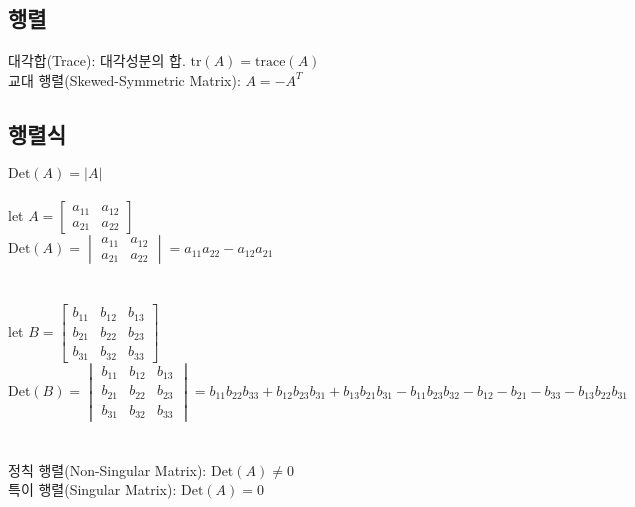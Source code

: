 \subsection{행렬}
대각합(Trace): 대각성분의 합. $\mathrm{tr}(A) = \mathrm{trace}(A)$\\
교대 행렬(Skewed-Symmetric Matrix): $A=-A^T$

\subsection{행렬식}
$\mathrm{Det}(A) = |A|$\\\\
let $A = \begin{bmatrix}
    a_{11} & a_{12}\\
    a_{21} & a_{22}
\end{bmatrix}$\\
$\mathrm{Det}(A) = \begin{vmatrix}
    a_{11} & a_{12}\\
    a_{21} & a_{22}
\end{vmatrix} = a_{11}a_{22}-a_{12}a_{21}$\\\\\\
let $B = \begin{bmatrix}
    b_{11}&b_{12}&b_{13}\\
    b_{21}&b_{22}&b_{23}\\
    b_{31}&b_{32}&b_{33}
\end{bmatrix}$\\
$\mathrm{Det}(B) = \begin{vmatrix}
    b_{11}&b_{12}&b_{13}\\
    b_{21}&b_{22}&b_{23}\\
    b_{31}&b_{32}&b_{33}
\end{vmatrix} = b_{11}b_{22}b_{33}+b_{12}b_{23}b_{31}+b_{13}b_{21}b_{31}-b_{11}b_{23}b_{32}-b_{12}-b_{21}-b_{33}-b_{13}b_{22}b_{31}$\\\\\\
정칙 행렬(Non-Singular Matrix): $\mathrm{Det}(A) \neq 0$\\
특이 행렬(Singular Matrix): $\mathrm{Det}(A) = 0$\\
